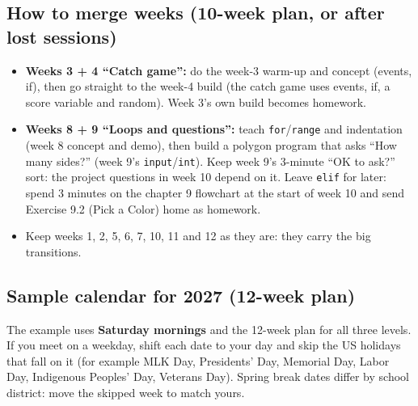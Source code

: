 \documentclass[level=1,teacher]{kidscode}
\begin{document}
\subsection{How to merge weeks (10-week plan, or after lost sessions)}
\begin{itemize}[itemsep=3pt]
  \item \textbf{Weeks 3 + 4 \enquote{Catch game}:} do the week-3 warm-up and concept (events, if), then go straight
        to the week-4 build (the catch game uses events, if, a score variable and random). Week 3's own build
        becomes homework.
  \item \textbf{Weeks 8 + 9 \enquote{Loops and questions}:} teach \texttt{for}/\texttt{range} and indentation (week 8
        concept and demo), then build a polygon program that asks \enquote{How many sides?} (week 9's
        \texttt{input}/\texttt{int}). Keep week 9's 3-minute \enquote{OK to ask?} sort: the project questions in week 10 depend on it. Leave \texttt{elif} for later: spend 3 minutes on the chapter 9 flowchart at the start of week 10 and send Exercise 9.2 (Pick a Color) home as homework.
  \item Keep weeks 1, 2, 5, 6, 7, 10, 11 and 12 as they are: they carry the big transitions.
\end{itemize}

\subsection{Sample calendar for 2027 (12-week plan)}
The example uses \textbf{Saturday mornings} and the 12-week plan for all three levels. If you meet on a
weekday, shift each date to your day and skip the US holidays that fall on it (for example MLK Day,
Presidents' Day, Memorial Day, Labor Day, Indigenous Peoples' Day, Veterans Day). Spring break dates differ
by school district: move the skipped week to match yours.
\end{document}
